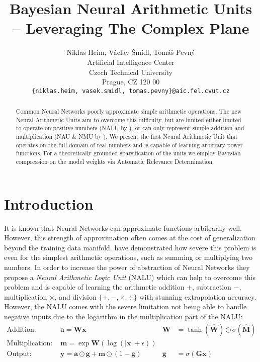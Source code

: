 \documentclass[9pt]{article}
\title{Bayesian Neural Arithmetic Units -- Leveraging The Complex Plane}
\author{
  Niklas Heim,
  V\'aclav \v Sm\'idl,
  Tom\'a\v s Pevn\'y \\
  Artificial Intelligence Center\\
  Czech Technical University\\
  Prague, CZ 120 00\\
  \texttt{\{niklas.heim, vasek.smidl, tomas.pevny\}@aic.fel.cvut.cz}\\
}
\begin{document}
\maketitle

\begin{abstract}
  Common Neural Networks poorly approximate simple arithmetic operations.  The
  new Neural Arithmetic Units aim to overcome this difficulty, but are limited
  either limited to operate on positive numbers (NALU by
  \citet{trask_neural_2018}), or can only represent simple addition and
  multiplication (NAU \& NMU by \citet{madsen_neural_2020}).
  We present the first Neural Arithmetic Unit that operates on the full domain
  of real numbers and is capable of learning arbitrary power functions.
  For a theoretically grounded sparsification of the units we employ Bayesian
  compression on the model weights via Automatic Relevance Determination.
\end{abstract}

\section{Introduction}%
\label{sec:introduction}

It is known that Neural Networks can approximate functions arbitrarily
well.  However, this strength of approximation
often comes at the cost of generalization beyond the training data manifold.
\citet{trask_neural_2018} have demonstrated how severe this problem is even for
the simplest arithmetic operations, such as summing or multiplying two numbers.
In order to increase the power of abstraction of Neural Networks they propose a
\emph{Neural Arithmetic Logic Unit} (NALU) which can help to overcome this problem
\cite{trask_neural_2018} and is capable of learning the arithmetic addition
$+$, subtraction $-$, multiplication $\times$, and division
$\{+,-,\times,\div\}$ with stunning extrapolation accuracy.
However, the NALU comes with the severe limitation not being able to handle negative
inputs due to the logarithm in the multiplication part of the NALU:
\begin{align}
  \label{eq:nalu}
  \text{Addition: }       & \bm a = \bm W \bm x                  
                          & \bm W& = \tanh(\hat{\bm W}) \odot \sigma(\hat{\bm M}) \\
  \text{Multiplication: } & \bm m = \exp \bm W(\log(|\bm x|+\epsilon)) & &\\
  \text{Output: }         & \bm y = \bm a \odot \bm g + \bm m \odot (1-\bm g) 
                          & \bm g& = \sigma(\bm G\bm x)
\end{align}
\end{document}
